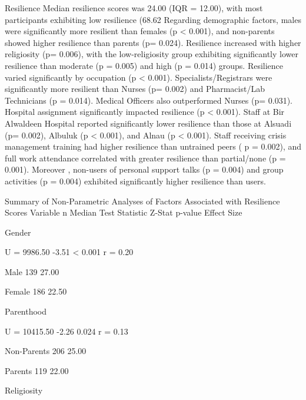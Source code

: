 Resilience
Median resilience scores was 24.00 (IQR = 12.00), with most participants exhibiting low resilience (68.62%
Regarding demographic factors, males were significantly more resilient than females (p < 0.001), and non-parents showed higher resilience than parents (p= 0.024). Resilience increased with higher religiosity (p= 0.006), with the low-religiosity group exhibiting significantly lower resilience than moderate (p = 0.005) and high (p = 0.014) groups.  
Resilience varied significantly by occupation (p < 0.001). Specialists/Registrars were significantly more resilient than Nurses (p= 0.002) and Pharmacist/Lab Technicians (p = 0.014). Medical Officers also outperformed Nurses (p= 0.031).  
Hospital assignment significantly impacted resilience (p < 0.001). Staff at Bir Alwaldeen Hospital reported significantly lower resilience than those at Alsuadi (p= 0.002), Albuluk (p < 0.001), and Alnau (p < 0.001). Staff receiving crisis management training had higher resilience than untrained peers ( p = 0.002), and full work attendance correlated with greater resilience than partial/none (p = 0.001).  
Moreover , non-users of personal support talks (p = 0.004) and group activities (p = 0.004) exhibited significantly higher resilience than users.  



Summary of Non-Parametric Analyses of Factors Associated with Resilience Scores
Variable
n
Median
Test Statistic
Z-Stat
p-value
Effect Size

Gender


U = 9986.50
-3.51
< 0.001
r = 0.20

   Male
139
27.00





   Female
186
22.50





Parenthood


U = 10415.50
-2.26
0.024
r = 0.13

   Non-Parents
206
25.00





   Parents
119
22.00





Religiosity


